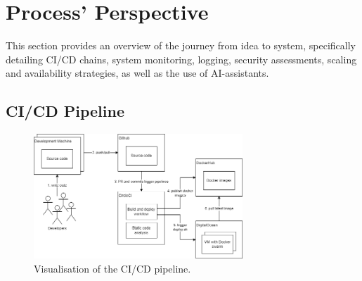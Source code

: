 \section{Process' Perspective}



This section provides an overview of the journey from idea to system, specifically detailing CI/CD chains, system monitoring, logging, security assessments, scaling and availability strategies, as well as the use of AI-assistants. %


\subsection{CI/CD Pipeline}

\begin{figure}[H]
    \centering
    \includegraphics[width=0.7\textwidth]{images/cicd.png}
    \caption{Visualisation of the CI/CD pipeline.}
    \label{fig:cicd}
\end{figure}

